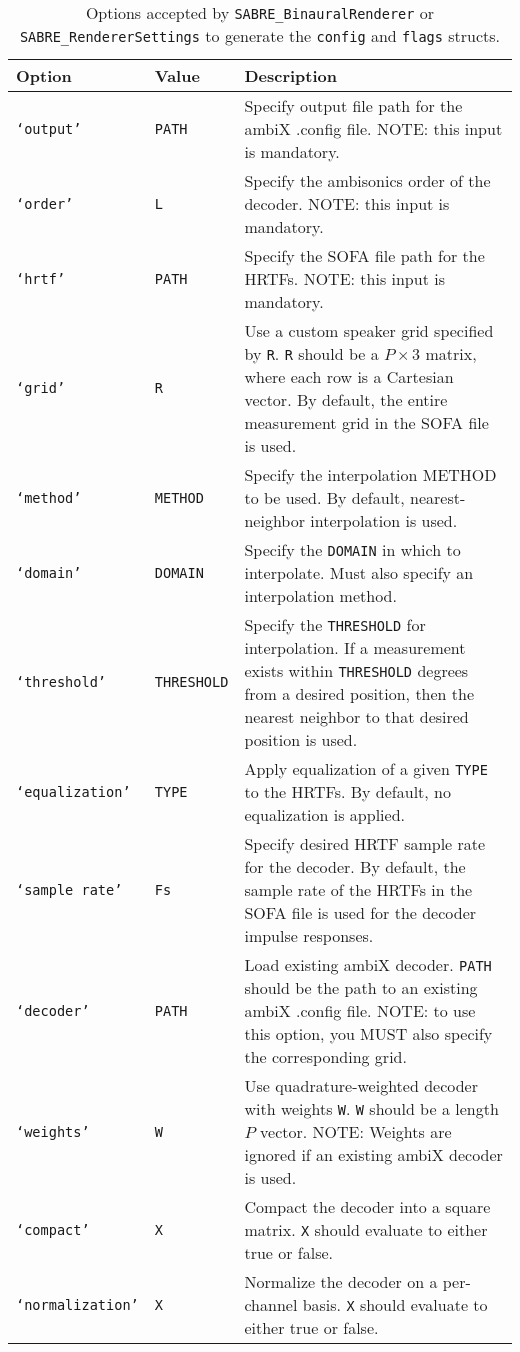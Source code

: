 \documentclass[11pt, oneside]{article}
\begin{document}
\begin{table}
\centering
	\begin{tabular}{| l | l | p{10cm} |}
	\hline
	\textbf{Option} & \textbf{Value} & \textbf{Description} \\ \hline
	\texttt{`output'} & \texttt{PATH} & Specify output file path for the ambiX .config file.
		NOTE: this input is mandatory. \\ \hline
	\texttt{`order'} & \texttt{L} & Specify the ambisonics order of the decoder.
		NOTE: this input is mandatory. \\ \hline
	\texttt{`hrtf'} & \texttt{PATH} & Specify the SOFA file path for the HRTFs.
		NOTE: this input is mandatory. \\ \hline
	\texttt{`grid'} & \texttt{R} & Use a custom speaker grid specified by \texttt{R}.
		\texttt{R} should be a $P \times 3$ matrix, where each row is a Cartesian vector.
		By default, the entire measurement grid in the SOFA file is used. \\ \hline
	\texttt{`method'} & \texttt{METHOD} & Specify the interpolation METHOD to be used.
		By default, nearest-neighbor interpolation is used. \\ \hline
	\texttt{`domain'} & \texttt{DOMAIN} & Specify the \texttt{DOMAIN} in which to interpolate.
		Must also specify an interpolation method. \\ \hline
	\texttt{`threshold'} & \texttt{THRESHOLD} & Specify the \texttt{THRESHOLD} for interpolation.
		If a measurement exists within \texttt{THRESHOLD} degrees from a desired position,
		then the nearest neighbor to that desired position is used. \\ \hline
	\texttt{`equalization'} & \texttt{TYPE} & Apply equalization of a given \texttt{TYPE} to the HRTFs.
		By default, no equalization is applied. \\ \hline
	\texttt{`sample rate'} & \texttt{Fs} & Specify desired HRTF sample rate for the decoder.
		By default, the sample rate of the HRTFs in the SOFA file is used for the decoder impulse responses. \\ \hline
	\texttt{`decoder'} & \texttt{PATH} & Load existing ambiX decoder.
		\texttt{PATH} should be the path to an existing ambiX .config file.
		NOTE: to use this option, you MUST also specify the corresponding grid. \\ \hline
	\texttt{`weights'} & \texttt{W} & Use quadrature-weighted decoder with weights \texttt{W}.
		\texttt{W} should be a length $P$ vector.
		NOTE: Weights are ignored if an existing ambiX decoder is used. \\ \hline
	\texttt{`compact'} & \texttt{X} & Compact the decoder into a square matrix.
		\texttt{X} should evaluate to either true or false. \\ \hline
	\texttt{`normalization'} & \texttt{X} & Normalize the decoder on a per-channel basis.
		\texttt{X} should evaluate to either true or false. \\ \hline
	\end{tabular}
	\caption{Options accepted by \texttt{SABRE\_BinauralRenderer} or \texttt{SABRE\_RendererSettings} to generate the \texttt{config} and \texttt{flags} structs.}
	\label{tab:Options}
\end{table}
\end{document}
